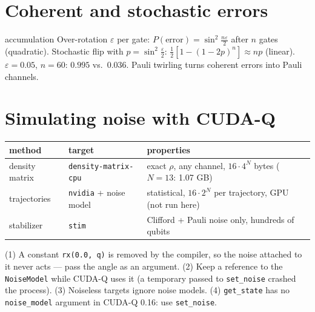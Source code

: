 \documentclass[11pt,a4paper,openany]{book}
\begin{document}
\section{Coherent and stochastic errors}
\begin{keyres}{accumulation}
Over-rotation $\varepsilon$ per gate: $P(\text{error}) = \sin^2\frac{n\varepsilon}{2}$ after $n$ gates (quadratic). Stochastic flip with $p = \sin^2\frac\varepsilon2$:
$\frac12[1 - (1-2p)^n] \approx np$ (linear). $\varepsilon = 0.05$, $n = 60$: $0.995$ vs.\ $0.036$. Pauli twirling turns coherent errors into Pauli channels.
\end{keyres}

\section{Simulating noise with CUDA-Q}
\begin{center}\small
\begin{tabularx}{\linewidth}{@{}llX@{}}\toprule method & target & properties\\ \midrule
density matrix & \texttt{density-matrix-cpu} & exact $\rho$, any channel, $16\cdot4^N$ bytes ($N = 13$: 1.07 GB)\\
trajectories & \texttt{nvidia} + noise model & statistical, $16\cdot2^N$ per trajectory, GPU (not run here)\\
stabilizer & \texttt{stim} & Clifford + Pauli noise only, hundreds of qubits\\ \bottomrule\end{tabularx}
\end{center}
\begin{trap}
(1) A constant \texttt{rx(0.0, q)} is removed by the compiler, so the noise attached to it never acts --- pass the angle as an argument.
(2) Keep a reference to the \texttt{NoiseModel} while CUDA-Q uses it (a temporary passed to \texttt{set\_noise} crashed the process).
(3) Noiseless targets ignore noise models. (4) \texttt{get\_state} has no \texttt{noise\_model} argument in CUDA-Q 0.16: use \texttt{set\_noise}.
\end{trap}

\end{document}
